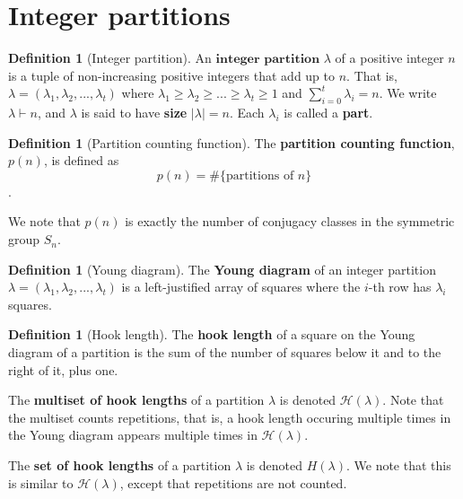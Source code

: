 \documentclass{article}
\theoremstyle{definition}
\theoremstyle{definition}
\newtheorem{defn}[thm]{Definition}
\theoremstyle{definition}
\begin{document}
\section{Integer partitions}
\begin{defn}[Integer partition]
    An $\textbf{integer partition}$ $\lambda$ of a positive integer $n$ is a tuple of non-increasing positive integers that add up to $n$. That is, $\lambda = (\lambda_1, \lambda_2, ..., \lambda_t)$ where $\lambda_1 \geq \lambda_2 \geq ... \geq \lambda_t \geq 1$ and $\sum\limits_{i=0}^t\lambda_i = n$. We write $\lambda \vdash n$, and $\lambda$ is said to have \textbf{size} $\mid\lambda\mid = n$. Each $\lambda_i$ is called a \textbf{part}.
\end{defn}

\begin{defn}[Partition counting function]
    The \textbf{partition counting function}, $p(n)$, is defined as 
    $$p(n) = \#\{\text{partitions of }n\}$$.

    We note that $p(n)$ is exactly the number of conjugacy classes in the symmetric group $S_n$.
\end{defn}

\begin{defn}[Young diagram]
    The \textbf{Young diagram} of an integer partition $\lambda = (\lambda_1, \lambda_2, ..., \lambda_t)$ is a left-justified array of squares where the $i$-th row has $\lambda_i$ squares.
\end{defn}
    
\begin{defn}[Hook length]
    The \textbf{hook length} of a square on the Young diagram of a partition is the sum of the number of squares below it and to the right of it, plus one. 

    The \textbf{multiset of hook lengths} of a partition $\lambda$ is denoted $\mathcal{H}(\lambda)$. Note that the multiset counts repetitions, that is, a hook length occuring multiple times in the Young diagram appears multiple times in $\mathcal{H}(\lambda)$. 

    The \textbf{set of hook lengths} of a partition $\lambda$ is denoted $H(\lambda)$. We note that this is similar to $\mathcal{H}(\lambda)$, except that repetitions are not counted. 
    
\end{defn}
\end{document}

